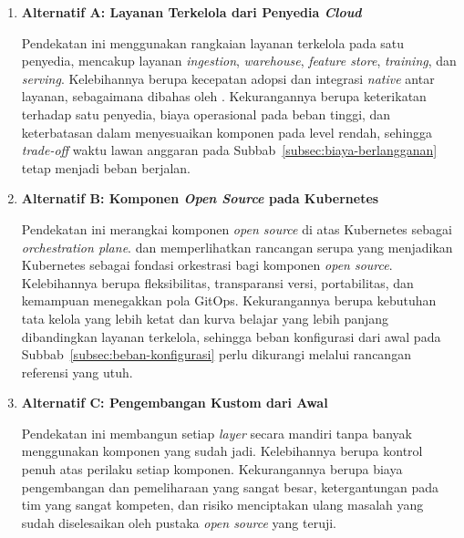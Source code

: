 \vspace{0.5em}
\begin{enumerate}
    \item \textbf{Alternatif A: Layanan Terkelola dari Penyedia \textit{Cloud}}

    Pendekatan ini menggunakan rangkaian layanan terkelola pada satu penyedia, mencakup layanan \textit{ingestion}, \textit{warehouse}, \textit{feature store}, \textit{training}, dan \textit{serving}. Kelebihannya berupa kecepatan adopsi dan integrasi \textit{native} antar layanan, sebagaimana dibahas oleh \textcite{li2023managed}. Kekurangannya berupa keterikatan terhadap satu penyedia, biaya operasional pada beban tinggi, dan keterbatasan dalam menyesuaikan komponen pada level rendah, sehingga \textit{trade-off} waktu lawan anggaran pada Subbab~\ref{subsec:biaya-berlangganan} tetap menjadi beban berjalan.

    \vspace{0.5em}

    \item \textbf{Alternatif B: Komponen \textit{Open Source} pada Kubernetes}

    Pendekatan ini merangkai komponen \textit{open source} di atas Kubernetes sebagai \textit{orchestration plane}. \textcite{lakka2025kubernetes} dan \textcite{burgueno2025toward} memperlihatkan rancangan serupa yang menjadikan Kubernetes sebagai fondasi orkestrasi bagi komponen \textit{open source}. Kelebihannya berupa fleksibilitas, transparansi versi, portabilitas, dan kemampuan menegakkan pola GitOps. Kekurangannya berupa kebutuhan tata kelola yang lebih ketat dan kurva belajar yang lebih panjang dibandingkan layanan terkelola, sehingga beban konfigurasi dari awal pada Subbab~\ref{subsec:beban-konfigurasi} perlu dikurangi melalui rancangan referensi yang utuh.

    \vspace{0.5em}

    \item \textbf{Alternatif C: Pengembangan Kustom dari Awal}

    Pendekatan ini membangun setiap \textit{layer} secara mandiri tanpa banyak menggunakan komponen yang sudah jadi. Kelebihannya berupa kontrol penuh atas perilaku setiap komponen. Kekurangannya berupa biaya pengembangan dan pemeliharaan yang sangat besar, ketergantungan pada tim yang sangat kompeten, dan risiko menciptakan ulang masalah yang sudah diselesaikan oleh pustaka \textit{open source} yang teruji.


\end{enumerate}
